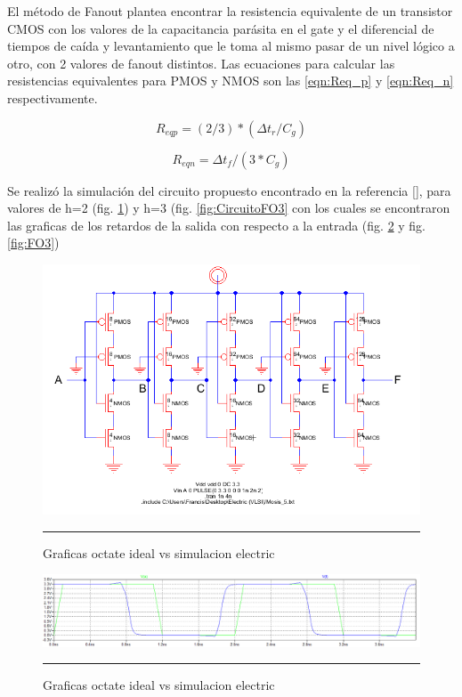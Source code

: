 \documentclass[12pt,a4paper]{article} %
\begin{document}
El método de Fanout plantea encontrar la resistencia equivalente de un transistor CMOS con los valores de la capacitancia parásita en el gate y el diferencial de tiempos de caída y levantamiento que le toma al mismo pasar de un nivel lógico a otro, con 2 valores de fanout distintos. Las ecuaciones para calcular las resistencias equivalentes para PMOS y NMOS son las \ref{eqn:Req_p} y \ref{eqn:Req_n} respectivamente.

\begin{equation}\label{eqn:Req_p}
R_{eqp}=(2/3)*( \Delta t_{r}/C_{g})
\end{equation}

\begin{equation}\label{eqn:Req_n}
R_{eqn}= \Delta t_{f}/(3*C_{g})
\end{equation}

Se realizó la simulación del circuito propuesto encontrado en la referencia [], para valores de h=2 (fig. \ref{fig:CircuitoFO2}) y h=3 (fig. \ref{fig:CircuitoFO3} con los cuales se encontraron las graficas de los retardos de la salida con respecto a la entrada (fig. \ref{fig:FO2} y fig. \ref{fig:FO3})

\begin{figure}[htbp]
  \centering
    \includegraphics[scale=0.5]{./CircuitoFO2.png}
    \rule{35em}{0.5pt}
  \caption[Captura]{Graficas octate ideal vs simulacion electric}
  \label{fig:CircuitoFO2}
\end{figure}

\begin{figure}[htbp]
  \centering
    \includegraphics[scale=0.4]{./FO2.png}
    \rule{35em}{1pt}
  \caption[Captura]{Graficas octate ideal vs simulacion electric}
  \label{fig:FO2}
\end{figure}
\end{document}
